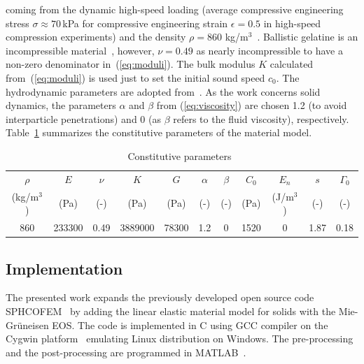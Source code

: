 \documentclass{svproc}
\newcommand{\unit}[2]{#1\,#2}
\newcommand{\reva}[1]{{\color{black}#1}}
\newcommand{\revb}[1]{{\color{black}#1}}
\begin{document}
\noindent
coming from the dynamic high-speed loading (average compressive engineering stress \unit{$\sigma\approx 70$}{kPa} for compressive engineering strain $\epsilon=0.5$ in high-speed compression experiments) and the density $\rho=860$ kg/m$^3$~\cite{Casem:2014}. Ballistic gelatine is an incompressible material~\cite{Czerner:2015}, \reva{however, $\nu=0.49$ as nearly incompressible to have a non-zero denominator in~(\ref{eq:moduli})}. The bulk modulus $K$ calculated from~(\ref{eq:moduli}) is used just to set the initial sound speed $c_0$. The hydrodynamic parameters are adopted from~\cite{Awoukeng:2014}. As the work concerns solid dynamics, the parameters $\alpha$ and $\beta$ from \revb{(\ref{eq:viscosity})} are chosen 1.2 (to avoid interparticle penetrations) and 0 (as $\beta$ refers to the fluid viscosity), respectively. Table~\ref{eq:parameters} summarizes the constitutive parameters of the material model.

\begin{table}
\label{eq:parameters}
\caption{Constitutive parameters~\cite{Awoukeng:2014,Casem:2014}}%
\begin{center}
\begin{tabular}{c|c|c|c|c|c|c|c|c|c|c}
\vspace{-1mm}
$\rho$ & $E$ & $\nu$ & $K$ & $G$ & $\alpha$ & $\beta$ & $C_0$ & $E_n$ & $s$ & $\Gamma_0$ \\
\reva{(kg/m$^\mathrm{3}$)} & \reva{(Pa)} & \reva{(-)} & \reva{(Pa)} & \reva{(Pa)} & \reva{(-)} & \reva{(-)} & \reva{(Pa)} & \reva{(J/m$^\mathrm{3}$)} & \reva{(-)} & \reva{(-)} \\
\hline
860 & 233300 & 0.49 & 3889000 & 78300 & 1.2 & 0 & 1520 & 0 & 1.87 & 0.18
\end{tabular}
\end{center}
\end{table}
\vspace{-1cm}
%
\subsection{Implementation}
%
The presented work expands the previously developed open source code SPHCOFEM~\cite{Hyncik:2015,Hyncik:2022,SPHCOFEM} by adding the linear elastic material model for solids with the Mie-Grüneisen EOS. The code is implemented in C using GCC compiler on the Cygwin platform~\cite{Cygwin} emulating Linux distribution on Windows\revb{.} The pre-processing and the post-processing are programmed in MATLAB~\cite{MATLAB}.
\end{document}
